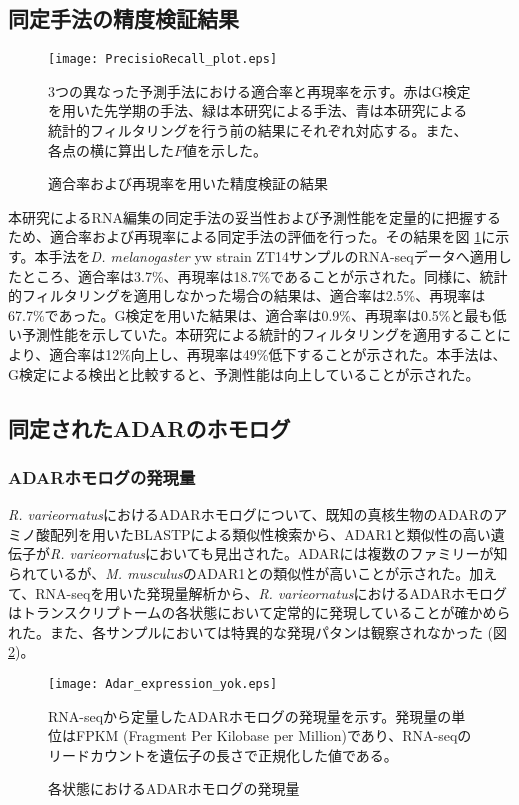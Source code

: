\subsection{同定手法の精度検証結果}
	\begin{figure}[!h]
		\centering
		\texttt{[image: PrecisioRecall\_plot.eps]}
		\caption{適合率および再現率を用いた精度検証の結果}
		\begin{flushleft}
		\small{3つの異なった予測手法における適合率と再現率を示す。赤はG検定を用いた先学期の手法、緑は本研究による手法、青は本研究による統計的フィルタリングを行う前の結果にそれぞれ対応する。また、各点の横に算出した$F$値を示した。}
		\end{flushleft}
		\label{fig:predac}
	\end{figure}
本研究によるRNA編集の同定手法の妥当性および予測性能を定量的に把握するため、適合率および再現率による同定手法の評価を行った。その結果を図 \ref{fig:predac}に示す。本手法を{\it D. melanogaster} yw strain ZT14サンプルのRNA-seqデータへ適用したところ、適合率は3.7\%、再現率は18.7\%であることが示された。同様に、統計的フィルタリングを適用しなかった場合の結果は、適合率は2.5\%、再現率は67.7\%であった。G検定を用いた結果は、適合率は0.9\%、再現率は0.5\%と最も低い予測性能を示していた。本研究による統計的フィルタリングを適用することにより、適合率は12\%向上し、再現率は49\%低下することが示された。本手法は、G検定による検出と比較すると、予測性能は向上していることが示された。

\subsection{同定されたADARのホモログ}
\subsubsection{ADARホモログの発現量}
{\it R. varieornatus}におけるADARホモログについて、既知の真核生物のADARのアミノ酸配列を用いたBLASTPによる類似性検索から、ADAR1と類似性の高い遺伝子が{\it R. varieornatus}においても見出された。ADARには複数のファミリーが知られているが、{\it M. musculus}のADAR1との類似性が高いことが示された。加えて、RNA-seqを用いた発現量解析から、{\it R. varieornatus}におけるADARホモログはトランスクリプトームの各状態において定常的に発現していることが確かめられた。また、各サンプルにおいては特異的な発現パタンは観察されなかった (図\ref {fig:ExpAdar})。

\begin{figure}[!h]
	\centering
	\texttt{[image: Adar\_expression\_yok.eps]}
	\caption{各状態におけるADARホモログの発現量}
	\begin{flushleft}
		\small{RNA-seqから定量したADARホモログの発現量を示す。発現量の単位はFPKM (Fragment Per Kilobase per Million)であり、RNA-seqのリードカウントを遺伝子の長さで正規化した値である。}
	\end{flushleft}
	\label{fig:ExpAdar}
\end{figure}

